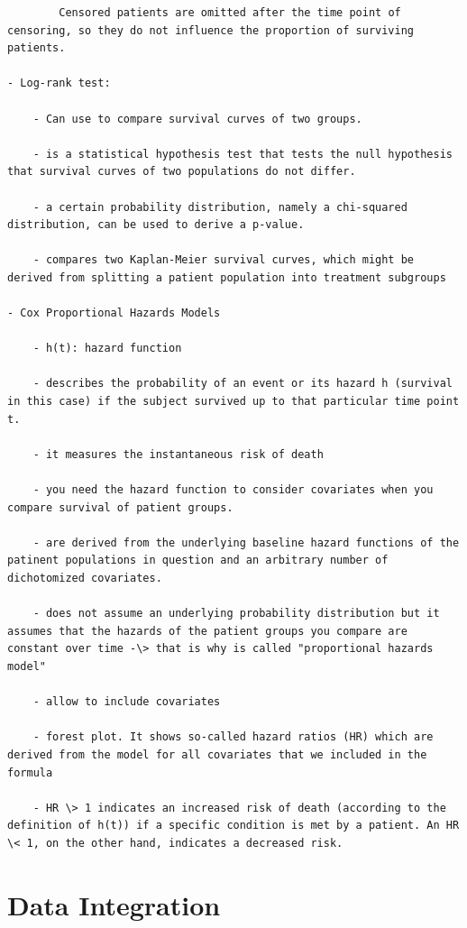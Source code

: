 \documentclass[
]{book}
\begin{document}
\begin{verbatim}
        Censored patients are omitted after the time point of censoring, so they do not influence the proportion of surviving patients.

- Log-rank test:

    - Can use to compare survival curves of two groups.

    - is a statistical hypothesis test that tests the null hypothesis that survival curves of two populations do not differ.

    - a certain probability distribution, namely a chi-squared distribution, can be used to derive a p-value.

    - compares two Kaplan-Meier survival curves, which might be derived from splitting a patient population into treatment subgroups

- Cox Proportional Hazards Models

    - h(t): hazard function

    - describes the probability of an event or its hazard h (survival in this case) if the subject survived up to that particular time point t.

    - it measures the instantaneous risk of death

    - you need the hazard function to consider covariates when you compare survival of patient groups.

    - are derived from the underlying baseline hazard functions of the patinent populations in question and an arbitrary number of dichotomized covariates.

    - does not assume an underlying probability distribution but it assumes that the hazards of the patient groups you compare are constant over time -\> that is why is called "proportional hazards model"

    - allow to include covariates

    - forest plot. It shows so-called hazard ratios (HR) which are derived from the model for all covariates that we included in the formula

    - HR \> 1 indicates an increased risk of death (according to the definition of h(t)) if a specific condition is met by a patient. An HR \< 1, on the other hand, indicates a decreased risk.
\end{verbatim}

\hypertarget{data-integration}{%
\section{Data Integration}\label{data-integration}}
\end{document}
